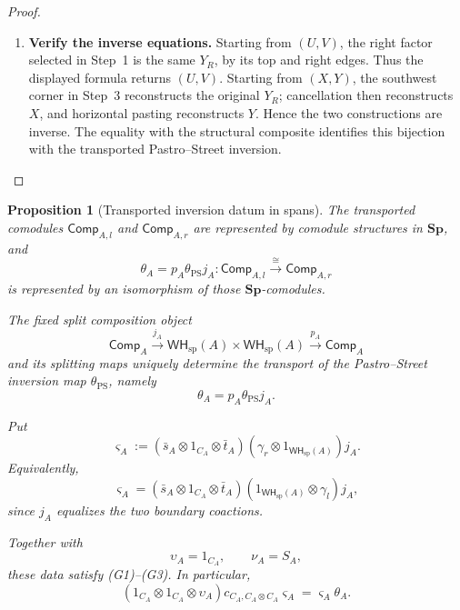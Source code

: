 \documentclass[oneside]{article}
\newcommand{\WH}{\mathsf{WH}}
\newcommand{\Sp}{\mathbf{Sp}}
\theoremstyle{plain}
\newtheorem{proposition}[theorem]{Proposition}
\theoremstyle{definition}
\theoremstyle{remark}
\begin{document}
\begin{proof}
\begin{enumerate}[beginpenalty=10000]
        \item \textbf{Verify the inverse equations.}
        Starting from \((U,V)\), the right factor selected in Step~1
        is the same \(Y_R\), by its top and right edges. Thus the
        displayed formula returns \((U,V)\). Starting from
        \((X,Y)\), the southwest corner in Step~3 reconstructs the
        original \(Y_R\); cancellation then reconstructs \(X\),
        and horizontal pasting reconstructs \(Y\). Hence the two
        constructions are inverse. The equality with the structural
        composite identifies this bijection with the transported
        Pastro--Street inversion. \qedhere
    \end{enumerate}
\end{proof}

\begin{proposition}[Transported inversion datum in spans]
\label{prop:cgqg-transported-inversion-in-spans}
    The transported comodules \(\mathsf{Comp}_{A,l}\) and \(\mathsf{Comp}_{A,r}\) are represented by comodule structures in \(\Sp\), and
    \[
        \theta_A
        =
        p_A\theta_{\mathrm{PS}}j_A:
        \mathsf{Comp}_{A,l}
        \xrightarrow{\cong}
        \mathsf{Comp}_{A,r}
    \]
    is represented by an isomorphism of those \(\Sp\)-comodules.

    The fixed split composition object
    \[
        \mathsf{Comp}_A
        \xrightarrow{\,j_A\,}
        \WH_{\mathrm{sp}}(A)\times\WH_{\mathrm{sp}}(A)
        \xrightarrow{\,p_A\,}
        \mathsf{Comp}_A
    \]
    and its splitting maps uniquely determine the transport of the Pastro--Street inversion map \(\theta_{\mathrm{PS}}\), namely
    \[
        \theta_A
        =
        p_A\theta_{\mathrm{PS}}j_A.
    \]

    Put
    \begin{equation}
        \varsigma_A
        :=
        (\bar s_A\otimes1_{C_A}\otimes\bar t_A)
        (\gamma_r\otimes1_{\WH_{\mathrm{sp}}(A)})
        j_A.
        \label{eq:cgqg-transported-varsigma}
    \end{equation}
    Equivalently,
    \begin{equation}
        \varsigma_A
        =
        (\bar s_A\otimes1_{C_A}\otimes\bar t_A)
        (1_{\WH_{\mathrm{sp}}(A)}\otimes\gamma_l)
        j_A,
        \label{eq:cgqg-transported-varsigma-second-form}
    \end{equation}
    since \(j_A\) equalizes the two boundary coactions.

    Together with
    \[
        \upsilon_A=1_{C_A},
        \qquad
        \nu_A=S_A,
    \]
    these data satisfy \textup{(G1)--(G3)}. In particular,
    \begin{equation}
        (1_{C_A}\otimes1_{C_A}\otimes\upsilon_A)
        c_{C_A,C_A\otimes C_A}
        \varsigma_A
        =
        \varsigma_A\theta_A.
        \label{eq:cgqg-transported-G3}
    \end{equation}
\end{proposition}
\end{document}
